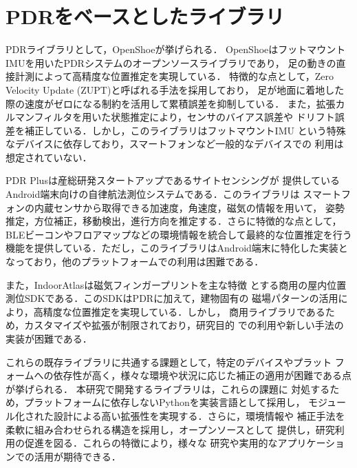 \section{PDRをベースとしたライブラリ}

PDRライブラリとして，OpenShoe\cite{openshoe}が挙げられる．
OpenShoeはフットマウントIMUを用いたPDRシステムのオープンソースライブラリであり，
足の動きの直接計測によって高精度な位置推定を実現している．
特徴的な点として，Zero Velocity Update (ZUPT)と呼ばれる手法を採用しており，
足が地面に着地した際の速度がゼロになる制約を活用して累積誤差を抑制している．
また，拡張カルマンフィルタを用いた状態推定により，センサのバイアス誤差や
ドリフト誤差を補正している．しかし，このライブラリはフットマウントIMU
という特殊なデバイスに依存しており，スマートフォンなど一般的なデバイスでの
利用は想定されていない．

PDR Plus\cite{pdr-plus}は産総研発スタートアップであるサイトセンシングが
提供しているAndroid端末向けの自律航法測位システムである．このライブラリは
スマートフォンの内蔵センサから取得できる加速度，角速度，磁気の情報を用いて，
姿勢推定，方位補正，移動検出，進行方向を推定する．さらに特徴的な点として，
BLEビーコンやフロアマップなどの環境情報を統合して最終的な位置推定を行う
機能を提供している．ただし，このライブラリはAndroid端末に特化した実装と
なっており，他のプラットフォームでの利用は困難である．

また，IndoorAtlas\cite{indoor-atlas}は磁気フィンガープリントを主な特徴
とする商用の屋内位置測位SDKである．このSDKはPDRに加えて，建物固有の
磁場パターンの活用により，高精度な位置推定を実現している．しかし，
商用ライブラリであるため，カスタマイズや拡張が制限されており，研究目的
での利用や新しい手法の実装が困難である．

これらの既存ライブラリに共通する課題として，特定のデバイスやプラット
フォームへの依存性が高く，様々な環境や状況に応じた補正の適用が困難である点が挙げられる．
本研究で開発するライブラリは，これらの課題に
対処するため，プラットフォームに依存しないPythonを実装言語として採用し，
モジュール化された設計による高い拡張性を実現する．さらに，環境情報や
補正手法を柔軟に組み合わせられる構造を採用し，オープンソースとして
提供し，研究利用の促進を図る．これらの特徴により，様々な
研究や実用的なアプリケーションでの活用が期待できる．




